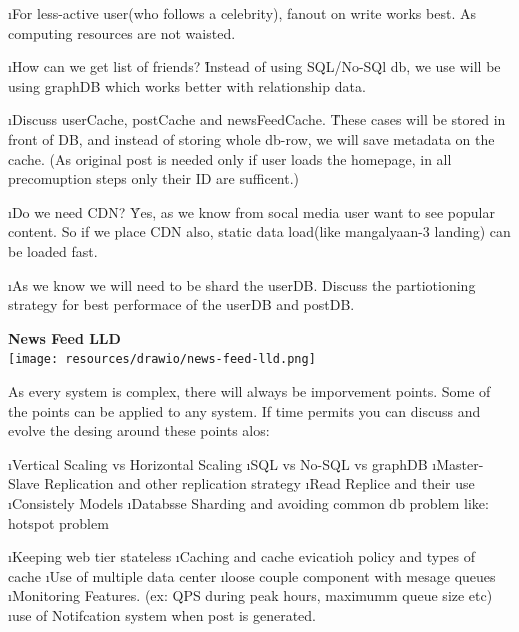     \i For less-active user(who follows a celebrity), fanout on write works best. As computing resources are not waisted.

    \i How can we get list of friends?
    \r Instead of using SQL/No-SQl db, we use will be using \b{graphDB}  which works better with relationship data.

    \i Discuss userCache, postCache and newsFeedCache.
    \r These cases will be stored in front of DB, and instead of storing whole db-row, we will save metadata on the cache. (As original post is needed only if user loads the homepage, in all precomuption steps only their ID are sufficent.)

    \i Do we need CDN?
    \r Yes, as we know from socal media user want to see popular content. So if we place CDN also, static data load(like mangalyaan-3 landing) can be loaded fast.

    \i As we know we will need to be shard the userDB. Discuss the partiotioning strategy for best performace of the userDB and postDB.
\lend

\textbf{News Feed LLD}\\
\texttt{[image: resources/drawio/news-feed-lld.png]}

As every system is complex, there will always be imporvement points. Some of the points can be applied to any system.
If time permits you can discuss and evolve the desing around these points alos:\

\ls
    \i Vertical Scaling vs Horizontal Scaling
    \i SQL  vs No-SQL vs graphDB
    \i Master-Slave Replication and other replication strategy
    \i Read Replice and their use
    \i Consistely Models
    \i Databsse Sharding and avoiding common db problem like: hotspot problem
\le

\ls
    \i Keeping web tier stateless
    \i Caching and cache evicatioh policy and types of cache
    \i Use of multiple data center
    \i loose couple component with mesage queues
    \i Monitoring Features. (ex: QPS during peak hours, maximumm queue size etc)
    \i use of Notifcation system when post is generated.
\le
